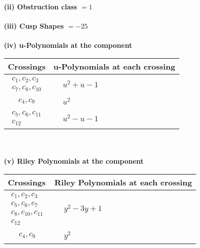 \documentclass[1p]{elsarticle_modified}
\theoremstyle{definition}
\begin{document}
\flushleft \textbf{(ii) Obstruction class $= 1$}\\~\\
\flushleft \textbf{(iii) Cusp Shapes $= -25$}\\~\\
\newpage\renewcommand{\arraystretch}{1}
\flushleft \textbf{(iv) u-Polynomials at the component}\newline \\
\begin{tabular}{m{50pt}|m{274pt}}
Crossings & \hspace{64pt}u-Polynomials at each crossing \\
\hline $$\begin{aligned}c_{1},c_{2},c_{3}\\c_{7},c_{8},c_{10}\end{aligned}$$&$\begin{aligned}
&u^2+u-1
\end{aligned}$\\
\hline $$\begin{aligned}c_{4},c_{9}\end{aligned}$$&$\begin{aligned}
&u^2
\end{aligned}$\\
\hline $$\begin{aligned}c_{5},c_{6},c_{11}\\c_{12}\end{aligned}$$&$\begin{aligned}
&u^2- u-1
\end{aligned}$\\
\hline
\end{tabular}\\~\\
\newpage\renewcommand{\arraystretch}{1}
\flushleft \textbf{(v) Riley Polynomials at the component}\newline \\
\begin{tabular}{m{50pt}|m{274pt}}
Crossings & \hspace{64pt}Riley Polynomials at each crossing \\
\hline $$\begin{aligned}c_{1},c_{2},c_{3}\\c_{5},c_{6},c_{7}\\c_{8},c_{10},c_{11}\\c_{12}\end{aligned}$$&$\begin{aligned}
&y^2-3 y+1
\end{aligned}$\\
\hline $$\begin{aligned}c_{4},c_{9}\end{aligned}$$&$\begin{aligned}
&y^2
\end{aligned}$\\
\hline
\end{tabular}\\~\\
\end{document}
